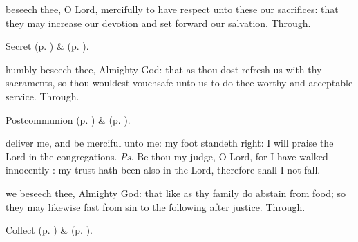 
\secret
{} beseech thee, O Lord, mercifully to have respect unto these our sacrifices: that they may increase our devotion and set forward our salvation. Through.
\begin{rubric}
     Secret  (p. \pageref{AshWednesdayMassSecret}) \&   (p. \pageref{SPLivingDeparted}).
\end{rubric}

\postcommunion
{} humbly beseech thee, Almighty God: that as thou dost refresh us with thy sacraments, so thou wouldest vouchsafe unto us to do thee worthy and acceptable service. Through.
\begin{rubric}
     Postcommunion  (p. \pageref{AshWednesdayMassPostcommunion}) \&   (p. \pageref{SPLivingDeparted}).
\end{rubric}


\introit
{} deliver me, and be merciful unto me: my foot standeth right: I will praise the Lord in the congregations. \textit{Ps.} Be thou my judge, O Lord, for I have walked innocently : my trust hath been also in the Lord, therefore shall I not fall.

\collect
{} we beseech thee, Almighty God: that like as thy family do abstain from food; so they may likewise fast from sin to the following after justice. Through.
\begin{rubric}
     Collect  (p. \pageref{AshWednesdayMassCollect}) \&   (p. \pageref{SPLivingDeparted}).
\end{rubric}

